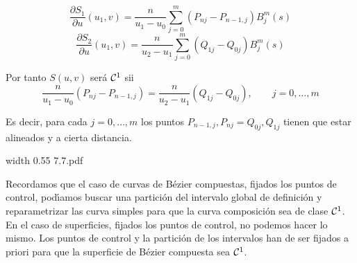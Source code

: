 \documentclass[twoside]{report}
\newcommand{\colocapdf}[2]{\quad\pdfimage width #2 {#1.pdf}}
\begin{document}
$$\frac{\partial S_1}{\partial u}(u_1,v)= \frac{n}{u_1-u_0} \sum_{j=0}^{m} (P_{nj}-P_{n-1,j}) B_j^{m}(s)$$
$$\frac{\partial S_2}{\partial u}(u_1,v)= \frac{n}{u_2-u_1} \sum_{j=0}^{m} (Q_{1j}-Q_{0j}) B_j^{m}(s)$$

Por tanto $S(u,v)$ ser\'{a} ${\cal C}^1$ sii
$$\frac{n}{u_1-u_0}(P_{nj}-P_{n-1,j})= \frac{n}{u_2-u_1}(Q_{1j}-Q_{0j}), \quad \quad j=0,\ldots,m$$

Es decir, para cada $j=0,\ldots,m$ los puntos $P_{n-1,j}, P_{nj}=Q_{0j}, Q_{1j}$ tienen que estar alineados y a cierta distancia.

\begin{center}
\colocapdf{7.7}{0.55\textwidth}
\end{center}

Recordamos que el caso de curvas de B\'{e}zier compuestas, fijados los puntos de control, pod\'{\i}amos buscar una partici\'{o}n del intervalo global de definici\'{o}n y reparametrizar las curva simples para que la curva composici\'{o}n sea de clase ${\cal C}^1$. En el caso de superficies, fijados los puntos de control, no podemos hacer lo mismo. Los puntos de control y la partici\'{o}n de los intervalos han de ser fijados a priori para que la superficie de B\'{e}zier compuesta sea ${\cal C}^1$.
\end{document}
